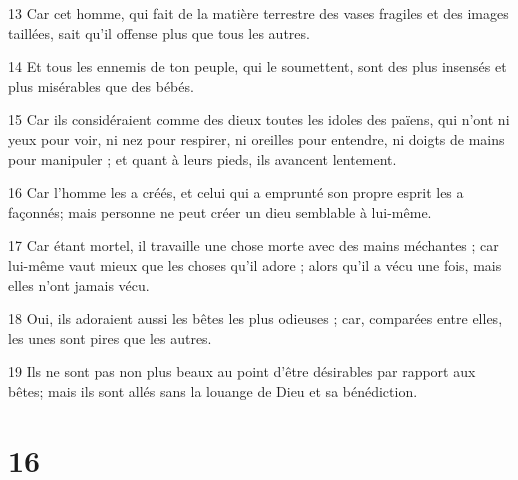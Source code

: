 \par 13 Car cet homme, qui fait de la matière terrestre des vases fragiles et des images taillées, sait qu'il offense plus que tous les autres.
\par 14 Et tous les ennemis de ton peuple, qui le soumettent, sont des plus insensés et plus misérables que des bébés.
\par 15 Car ils considéraient comme des dieux toutes les idoles des païens, qui n'ont ni yeux pour voir, ni nez pour respirer, ni oreilles pour entendre, ni doigts de mains pour manipuler ; et quant à leurs pieds, ils avancent lentement.
\par 16 Car l'homme les a créés, et celui qui a emprunté son propre esprit les a façonnés; mais personne ne peut créer un dieu semblable à lui-même.
\par 17 Car étant mortel, il travaille une chose morte avec des mains méchantes ; car lui-même vaut mieux que les choses qu'il adore ; alors qu'il a vécu une fois, mais elles n'ont jamais vécu.
\par 18 Oui, ils adoraient aussi les bêtes les plus odieuses ; car, comparées entre elles, les unes sont pires que les autres.
\par 19 Ils ne sont pas non plus beaux au point d'être désirables par rapport aux bêtes; mais ils sont allés sans la louange de Dieu et sa bénédiction.

\chapter{16}

